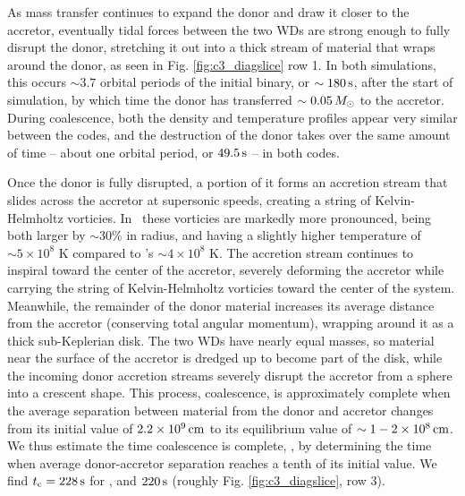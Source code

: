 As mass transfer continues to expand the donor and draw it closer to the accretor, eventually tidal forces between the two WDs are strong enough to fully disrupt the donor, stretching it out into a thick stream of material that wraps around the donor, as seen in Fig. \ref{fig:c3_diagslice} row 1.  In both simulations, this occurs $\sim3.7$ orbital periods of the initial binary, or $\sim180\,\mathrm{s}$, after the start of simulation, by which time the donor has transferred $\sim0.05\,\Msun$ to the accretor.  During coalescence, both the density and temperature profiles appear very similar between the codes, and the destruction of the donor takes over the same amount of time -- about one orbital period, or $49.5\,\mathrm{s}$ -- in both codes.


Once the donor is fully disrupted, a portion of it forms an accretion stream that slides across the accretor at supersonic speeds, creating a string of Kelvin-Helmholtz vorticies.  In \arepo\ these vorticies are markedly more pronounced, being both larger by $\sim30$\% in radius, and having a slightly higher temperature of $\sim5\times10^8$ K compared to \gasoline's $\sim4\times10^8$ K.  The accretion stream continues to inspiral toward the center of the accretor, severely deforming the accretor while carrying the string of Kelvin-Helmholtz vorticies toward the center of the system.  Meanwhile, the remainder of the donor material increases its average distance from the accretor (conserving total angular momentum), wrapping around it as a thick sub-Keplerian disk.  The two WDs have nearly equal masses, so material near the surface of the accretor is dredged up to become part of the disk, while the incoming donor accretion streams severely disrupt the accretor from a sphere into a crescent shape.  This process, coalescence, is approximately complete when the average separation between material from the donor and accretor changes from its initial value of $2.2\times10^9\,\mathrm{cm}$ to its equilibrium value of $\sim1-2\times10^8\,\mathrm{cm}$.  We thus estimate the time coalescence is complete, \tcoal, by determining the time when average donor-accretor separation reaches a tenth of its initial value.  We find $\tcoal = 228\,\mrm{s}$ for \gasoline, and $220\,\mathrm{s}$ (roughly Fig. \ref{fig:c3_diagslice}, row 3).

